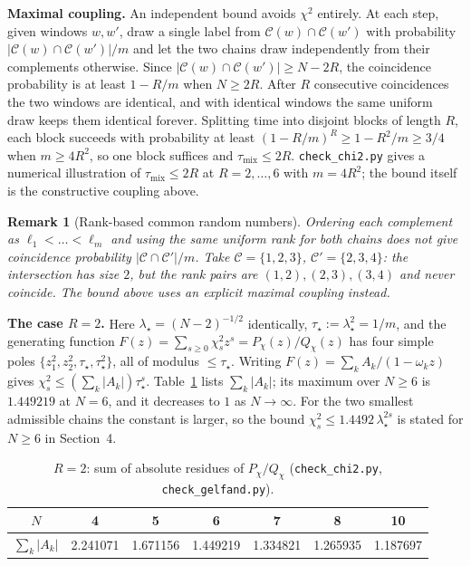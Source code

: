 \documentclass[twoside,11pt]{article}
\newtheorem{srem}[slemma]{Remark}
\begin{document}
\textbf{Maximal coupling.} An independent bound avoids
$\chi^2$ entirely. At each step, given windows $w,w'$, draw a single label
from $\mathcal{C}(w)\cap\mathcal{C}(w')$ with probability $|\mathcal{C}(w)\cap\mathcal{C}(w')|/m$ and let the two
chains draw independently from their complements otherwise. Since
$|\mathcal{C}(w)\cap\mathcal{C}(w')|\ge N-2R$, the coincidence probability is at least
$1-R/m$ when $N\ge2R$. After $R$ consecutive coincidences the two windows
are identical, and with identical windows the same uniform draw keeps them
identical forever. Splitting time into disjoint blocks of length $R$, each
block succeeds with probability at least $(1-R/m)^{R}\ge1-R^{2}/m\ge3/4$
when $m\ge4R^{2}$, so one block suffices and $\tau_{\mathrm{mix}}\le2R$.
\texttt{check\_chi2.py} gives a numerical illustration of $\tau_{\mathrm{mix}}\le2R$ at $R=2,\dots,6$ with $m=4R^{2}$; the bound itself is the constructive coupling above.

\begin{srem}[Rank-based common random numbers]\label{rem:S5-rank}\upshape
Ordering each complement as $\ell_1<\dots<\ell_m$ and using the same uniform rank
for both chains does \emph{not} give coincidence probability
$|\mathcal{C}\cap\mathcal{C}'|/m$. Take $\mathcal{C}=\{1,2,3\}$, $\mathcal{C}'=\{2,3,4\}$: the intersection has
size $2$, but the rank pairs are $(1,2),(2,3),(3,4)$ and never coincide.
The bound above uses an explicit maximal coupling instead.
\end{srem}

\textbf{The case $R=2$.} Here $\lambda_\star=(N-2)^{-1/2}$ identically,
$\tau_\star:=\lambda_\star^{2}=1/m$, and the generating function
$F(z)=\sum_{s\ge0}\chi^2_s z^{s}=P_\chi(z)/Q_\chi(z)$ has four simple poles
$\{z_1^{2},z_2^{2},\tau_\star,\tau_\star^{2}\}$, all of modulus $\le\tau_\star$. Writing
$F(z)=\sum_k A_k/(1-\omega_k z)$ gives
$\chi^2_s\le(\sum_k|A_k|)\tau_\star^{s}$. Table~\ref{tab:S5-R2} lists
$\sum_k|A_k|$; its maximum over $N\ge6$ is $1.449219$ at $N=6$, and it
decreases to $1$ as $N\to\infty$. For the two smallest admissible chains the
constant is larger, so the bound
$\chi^2_s\le1.4492\,\lambda_\star^{2s}$ is stated for $N\ge6$ in Section~4.

\begin{table}[htbp]
\centering
\begin{tabular}{ccccccc}
\toprule
$N$ & 4 & 5 & 6 & 7 & 8 & 10 \\
\midrule
$\sum_k|A_k|$ & 2.241071 & 1.671156 & 1.449219 & 1.334821 & 1.265935 & 1.187697 \\
\bottomrule
\end{tabular}
\caption{$R=2$: sum of absolute residues of $P_\chi/Q_\chi$
(\texttt{check\_chi2.py}, \texttt{check\_gelfand.py}).}
\label{tab:S5-R2}

\end{table}
\end{document}
